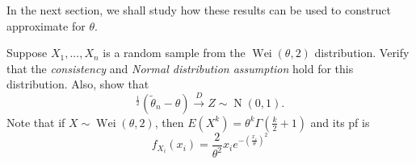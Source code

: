 \documentclass[notoc,notitlepage]{tufte-book}
\DeclareMathOperator{\Nor}{N }
\DeclareMathOperator{\Wei}{Wei }
\newcommand{\convd}{\overset{D}{\to}}
\begin{document}
In the next section, we shall study how these results can be used to construct approximate  for $\theta$.

\begin{eg}
  Suppose $X_1, ..., X_n$ is a random sample from the $\Wei(\theta, 2)$ distribution. Verify that the \textit{consistency} and \textit{Normal distribution assumption} hold for this distribution. Also, show that
  \begin{equation*}
    [ I(\tilde{\theta}_n; X) ]^{\frac{1}{2}} ( \tilde{\theta}_n - \theta ) \convd Z \sim \Nor(0, 1).
  \end{equation*}
  Note that if $X \sim \Wei(\theta, 2)$, then $E(X^k) = \theta^k \Gamma\left( \frac{k}{2} + 1 \right)$ and its pf is
  \begin{equation*}
    f_{X_i}(x_i) = \frac{2}{\theta^2} x_i e^{- \left( \frac{x_i}{\theta} \right)^2}
  \end{equation*}
\end{eg}
\end{document}
